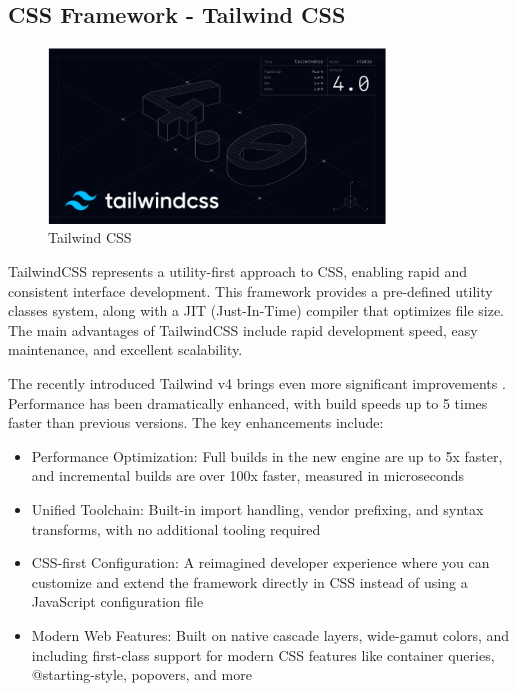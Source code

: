 \subsection{CSS Framework - Tailwind CSS}
\begin{figure}[H]
    \centering
    \includegraphics[width=0.8\textwidth]{root/tallwindcss.png}
    \caption{Tailwind CSS}
\end{figure}
TailwindCSS represents a utility-first approach to CSS, enabling rapid and consistent interface development. This framework provides a pre-defined utility classes system, along with a JIT (Just-In-Time) compiler that optimizes file size. The main advantages of TailwindCSS include rapid development speed, easy maintenance, and excellent scalability.

The recently introduced Tailwind v4 brings even more significant improvements \cite{tailwindcss-docs}. Performance has been dramatically enhanced, with build speeds up to 5 times faster than previous versions. The key enhancements include:

\begin{itemize}
\item Performance Optimization: Full builds in the new engine are up to 5x faster, and incremental builds are over 100x faster, measured in microseconds
\item Unified Toolchain: Built-in import handling, vendor prefixing, and syntax transforms, with no additional tooling required
\item CSS-first Configuration: A reimagined developer experience where you can customize and extend the framework directly in CSS instead of using a JavaScript configuration file
\item Modern Web Features: Built on native cascade layers, wide-gamut colors, and including first-class support for modern CSS features like container queries, @starting-style, popovers, and more
\end{itemize}

